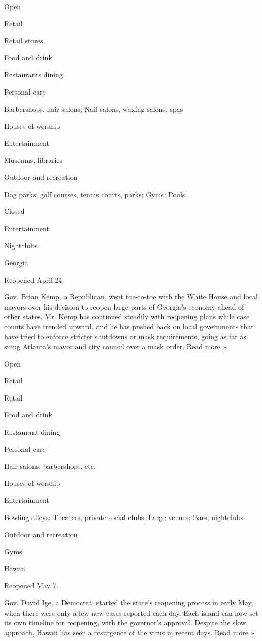Open

Retail

Retail stores

Food and drink

Restaurants dining

Personal care

Barbershops, hair salons; Nail salons, waxing salons, spas

Houses of worship

Entertainment

Museums, libraries

Outdoor and recreation

Dog parks, golf courses, tennis courts, parks; Gyms; Pools

Closed

Entertainment

Nightclubs

Georgia

Reopened April 24.

Gov. Brian Kemp, a Republican, went toe-to-toe with the White House and
local mayors over his decision to reopen large parts of Georgia's
economy ahead of other states. Mr. Kemp has continued steadily with
reopening plans while case counts have trended upward, and he has pushed
back on local governments that have tried to enforce stricter shutdowns
or mask requirements, going as far as suing Atlanta's mayor and city
council over a mask order.
\href{https://www.ledger-enquirer.com/news/coronavirus/article244285992.html}{Read
more »}

Open

Retail

Retail

Food and drink

Restaurant dining

Personal care

Hair salons, barbershops, etc.

Houses of worship

Entertainment

Bowling alleys; Theaters, private social clubs; Large venues; Bars,
nightclubs

Outdoor and recreation

Gyms

Hawaii

Reopened May 7.

Gov. David Ige, a Democrat, started the state's reopening process in
early May, when there were only a few new cases reported each day. Each
island can now set its own timeline for reopening, with the governor's
approval. Despite the slow approach, Hawaii has seen a resurgence of the
virus in recent days.
\href{https://www.bigislandvideonews.com/2020/06/04/hawaii-economic-reopening-strategy-posted-online/}{Read
more »}

